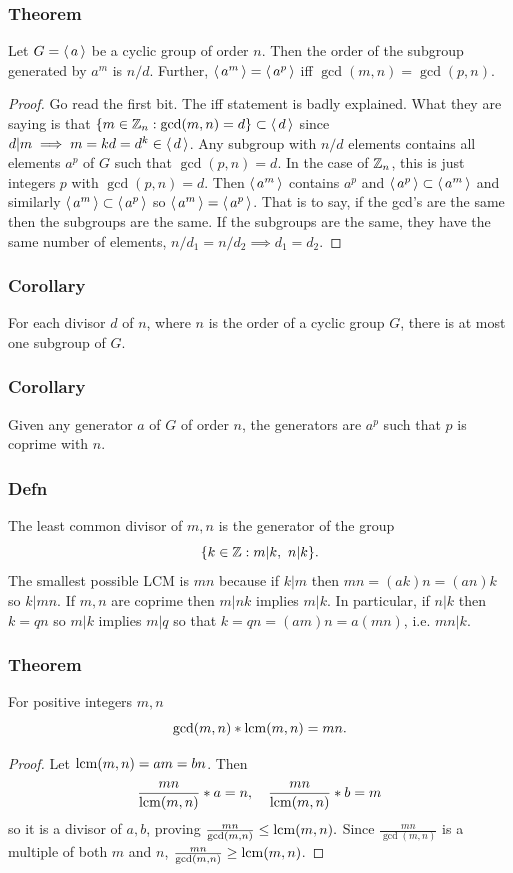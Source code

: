 \subsubsection*{Theorem}
Let $G = \operatorname{\langle} a \operatorname{\rangle}$ be a cyclic group of order $n$. Then the order of the subgroup generated by
$a^m$ is $n \slash d$. Further, $\operatorname{\langle} a^m \operatorname{\rangle} = \operatorname{\langle} a^p \operatorname{\rangle}$ iff $\gcd(m,n) = \gcd(p,n)$.
\begin{proof}
Go read the first bit. The iff statement is badly explained. What they are saying is that
$
\{m \in \operatorname{\mathbb{Z}}_n:\gcd(m,n) = d\} \subset \operatorname{\langle} d \operatorname{\rangle}
$
since $d \vert m \implies m = kd = d^k \in \operatorname{\langle} d \operatorname{\rangle}$. Any subgroup
with $n \slash d$ elements contains all elements $a^p$ of $G$ such that
$\gcd(p,n) = d$. In the case of $\operatorname{\mathbb{Z}}_n$, this is just integers $p$ with $\gcd(p,n) = d$.
Then $\operatorname{\langle} a^m \operatorname{\rangle}$ contains $a^p$ and $\operatorname{\langle} a^p \operatorname{\rangle} \subset \operatorname{\langle} a^m \operatorname{\rangle}$ and similarly $\operatorname{\langle} a^m \operatorname{\rangle} \subset \operatorname{\langle} a^p \operatorname{\rangle}$ so $\operatorname{\langle} a^m \operatorname{\rangle} = \operatorname{\langle} a^p \operatorname{\rangle}$. That is to say, if the gcd's are the same then the subgroups are the same.
If the subgroups are the same, they have the same number of elements, $n \slash d_1 = n \slash d_2 \implies d_1 = d_2$.
\end{proof}
\subsubsection*{Corollary}
For each divisor $d$ of $n$, where $n$ is the order of a cyclic group $G$, there is at most one subgroup of $G$.
\subsubsection*{Corollary}
Given any generator $a$ of $G$ of order $n$, the generators are $a^p$ such that $p$ is coprime with $n$.
\subsubsection*{Defn}
The least common divisor of $m,n$ is the generator of the group $$
\{k \in \operatorname{\mathbb{Z}}:m \vert k, \,\, n \vert k\}.
$$
The smallest possible LCM is $mn$ because if $k \vert m$ then $mn = (ak)n = (an)k$ so $k \vert mn$. If $m,n$ are coprime then $m \vert nk$ implies $m \vert k$. In particular,
if $n \vert k$ then $k = qn$ so $m \vert k$ implies $m \vert q$ so that $k = qn = (am)n = a(mn)$, i.e. $mn \vert k$.
\subsubsection*{Theorem}
For positive integers $m,n$
$$
\gcd(m,n) * \operatorname{lcm}(m,n) = mn.
$$
\begin{proof}
Let $\operatorname{lcm}(m,n) = am = bn$. Then $$\frac{mn}{\operatorname{lcm}(m,n)} * a = n,
\quad \frac{mn}{\operatorname{lcm}(m,n)} * b = m$$ so it is a divisor of $a,b$, proving $\frac{mn}{\gcd(m,n)} \leq \operatorname{lcm}(m,n).$
Since $\frac{mn}{\gcd(m,n)}$ is a multiple of both $m$ and $n$,
$\frac{mn}{\gcd(m,n)} \geq \operatorname{lcm}(m,n)$.
\end{proof}
